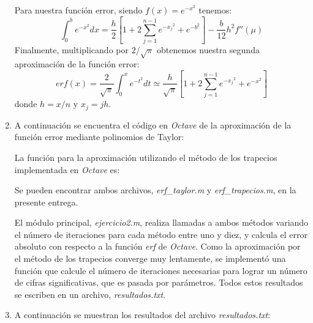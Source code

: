 \documentclass[titlepage,a4paper]{article}
\begin{document}
\begin{enumerate}[label=(\alph*)]
			Para nuestra función error, siendo $f(x) = e^{-x^2}$ tenemos:
				\begin{equation}
					\int_{0}^{b}e^{-x^2}dx = \frac{h}{2}\left[1 + 2\sum_{j=1}^{n-1}e^{-{x_j}^2}+e^{-b^2}\right]-\frac{b}{12}h^{2}f''(\mu)
				\end{equation}
			Finalmente, multiplicando por $2/\sqrt{\pi}$ obtenemos nuestra segunda aproximación de la función error:
				\begin{equation}
					erf(x) = \frac{2}{\sqrt{\pi}}\int_{0}^{x}e^{-t^2}dt \simeq \frac{h}{\sqrt{\pi}}\left[1 + 2\sum_{j=1}^{n-1}e^{-{x_j}^2}+e^{-x^2}\right]
				\end{equation}
			donde $h = x/n$ y $x_j = jh$.
		
		\item
			A continuación se encuentra el código en \emph{Octave} de la aproximación de la función error mediante polinomios de Taylor:
			
			
			La función para la aproximación utilizando el método de los trapecios implementada en \emph{Octave} es:
			

			Se pueden encontrar ambos archivos, \textit{erf\_taylor.m} y \textit{erf\_trapecios.m}, en la presente entrega.

			El módulo principal, \textit{ejercicio2.m}, realiza llamadas a ambos métodos variando el número de iteraciones para 
			cada método entre uno y diez, y calcula el error absoluto con respecto a la función \emph{erf} de \emph{Octave}.
			Como la aproximación por el método de los trapecios converge muy lentamente, se implementó una función que calcule el número 
			de iteraciones necesarias para lograr un número de cifras significativas, que es pasada por parámetros.
			Todos estos resultados se escriben en un archivo, \emph{resultados.txt}.
			
		
		\item
			A continuación se muestran los resultados del archivo \emph{resultados.txt}:
			

	\end{enumerate}
\end{document}
